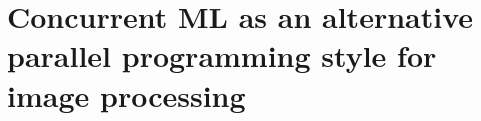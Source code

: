 
\newcommand{\hopac}{Hopac}





% 
%
\chapter{Concurrent ML as an alternative parallel programming style for image processing}
%
%
%


